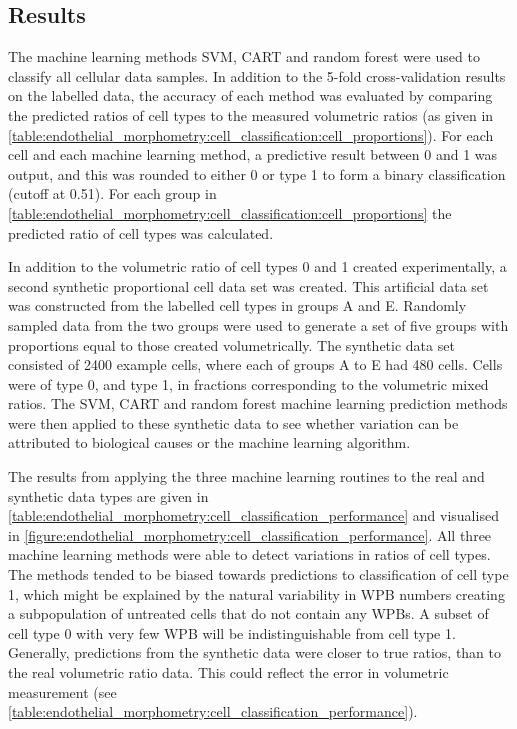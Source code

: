\subsection{Results}
The machine learning methods SVM, CART and random forest were used to classify all cellular data samples. In addition to the 5-fold cross-validation results on the labelled data, the accuracy of each method was evaluated by comparing the predicted ratios of cell types to the measured volumetric ratios (as given in \autoref{table:endothelial_morphometry:cell_classification:cell_proportions}). For each cell and each machine learning method, a predictive result between 0 and 1 was output, and this was rounded to either 0 or type 1 to form a binary classification (cutoff at 0.51). For each group in \autoref{table:endothelial_morphometry:cell_classification:cell_proportions} the predicted ratio of cell types was calculated.

In addition to the volumetric ratio of cell types 0 and 1 created experimentally, a second synthetic proportional cell data set was created. This artificial data set was constructed from the labelled cell types in groups A and E. Randomly sampled data from the two groups were used to generate a set of five groups with proportions equal to those created volumetrically. The synthetic data set consisted of 2400 example cells, where each of groups A to E had 480 cells. Cells were of type 0, and type 1, in fractions corresponding to the volumetric mixed ratios. The SVM, CART and random forest machine learning prediction methods were then applied to these synthetic data to see whether variation can be attributed to biological causes or the machine learning algorithm.

The results from applying the three machine learning routines to the real and synthetic data types are given in \autoref{table:endothelial_morphometry:cell_classification_performance} and visualised in \autoref{figure:endothelial_morphometry:cell_classification_performance}. All three machine learning methods were able to detect variations in ratios of cell types. The methods tended to be biased towards predictions to classification of cell type 1, which might be explained by the natural variability in WPB numbers creating a subpopulation of untreated cells that do not contain any WPBs. A subset of cell type 0 with very few WPB will be indistinguishable from cell type 1. Generally, predictions from the synthetic data were closer to true ratios, than to the real volumetric ratio data. This could reflect the error in volumetric measurement (see \autoref{table:endothelial_morphometry:cell_classification_performance}).

